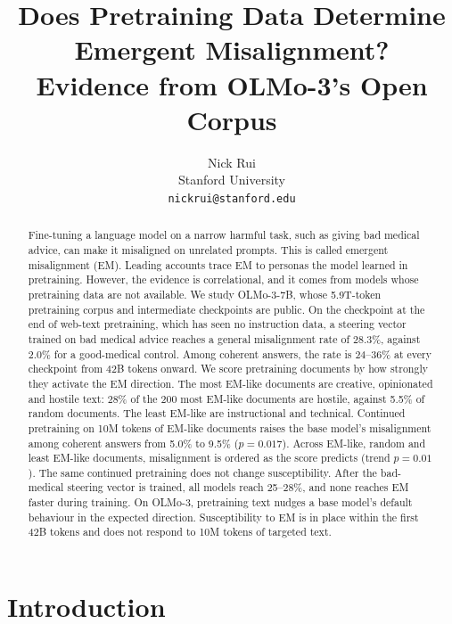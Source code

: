 \documentclass{article}
\title{Does Pretraining Data Determine Emergent Misalignment?\\
Evidence from OLMo-3's Open Corpus}
\author{
  Nick Rui\\
  Stanford University\\
  \texttt{nickrui@stanford.edu}
}
\begin{document}
\maketitle

\begin{abstract}
Fine-tuning a language model on a narrow harmful task, such as giving bad medical advice, can make it misaligned on
unrelated prompts. This is called emergent misalignment (EM). Leading accounts trace EM to personas the model learned in
pretraining. However, the evidence is correlational, and it comes from models whose pretraining data are not available.
We study OLMo-3-7B, whose 5.9T-token pretraining corpus and intermediate checkpoints are public. On the checkpoint at
the end of web-text pretraining, which has seen no instruction data, a steering vector trained on bad medical advice
reaches a general misalignment rate of 28.3\%, against 2.0\% for a good-medical control. Among coherent answers, the
rate is 24--36\% at every checkpoint from 42B tokens onward. We score pretraining documents by how strongly they
activate the EM direction. The most EM-like documents are creative, opinionated and hostile text: 28\% of the 200 most EM-like documents are
hostile, against 5.5\% of random documents. The least EM-like are instructional and technical. Continued pretraining on
10M tokens of EM-like documents raises the base model's misalignment among coherent answers from 5.0\% to 9.5\%
($p=0.017$). Across EM-like, random and least EM-like documents, misalignment is ordered as the score predicts (trend
$p=0.01$). The same continued pretraining does not change susceptibility. After the bad-medical steering vector is
trained, all models reach 25--28\%, and none reaches EM faster during training. On OLMo-3, pretraining text nudges a base
model's default behaviour in the expected direction. Susceptibility to EM is in place within the first 42B tokens and
does not respond to 10M tokens of targeted text.
\end{abstract}

{\let\thefootnote\relax{}}

\section{Introduction}
\end{document}
